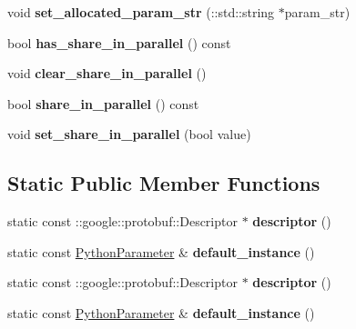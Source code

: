 \begin{DoxyCompactItemize}
void {\bfseries set\+\_\+allocated\+\_\+param\+\_\+str} (\+::std\+::string $\ast$param\+\_\+str)
\item 
\mbox{\label{classcaffe_1_1_python_parameter_abf6e28ac800ea4b9cb18fe6d4a0ff28e}} 
bool {\bfseries has\+\_\+share\+\_\+in\+\_\+parallel} () const
\item 
\mbox{\label{classcaffe_1_1_python_parameter_abb688fbfb89bc477941955511fb94291}} 
void {\bfseries clear\+\_\+share\+\_\+in\+\_\+parallel} ()
\item 
\mbox{\label{classcaffe_1_1_python_parameter_a57002d9da09ff4ec462e23a7dba97690}} 
bool {\bfseries share\+\_\+in\+\_\+parallel} () const
\item 
\mbox{\label{classcaffe_1_1_python_parameter_aa0c292ff47f8766e14180e54495e5033}} 
void {\bfseries set\+\_\+share\+\_\+in\+\_\+parallel} (bool value)
\end{DoxyCompactItemize}
\subsection*{Static Public Member Functions}
\begin{DoxyCompactItemize}
\item 
\mbox{\label{classcaffe_1_1_python_parameter_a7294f417dd3b8c0539aef2f90fae6749}} 
static const \+::google\+::protobuf\+::\+Descriptor $\ast$ {\bfseries descriptor} ()
\item 
\mbox{\label{classcaffe_1_1_python_parameter_aba97e31762347b5b0b7da9d49169118b}} 
static const \mbox{\hyperlink{classcaffe_1_1_python_parameter}{Python\+Parameter}} \& {\bfseries default\+\_\+instance} ()
\item 
\mbox{\label{classcaffe_1_1_python_parameter_abfc08cf50979c009d4da2a05efb926f0}} 
static const \+::google\+::protobuf\+::\+Descriptor $\ast$ {\bfseries descriptor} ()
\item 
\mbox{\label{classcaffe_1_1_python_parameter_adf4bacff6bc0f80ebefe01cf54f7336f}} 
static const \mbox{\hyperlink{classcaffe_1_1_python_parameter}{Python\+Parameter}} \& {\bfseries default\+\_\+instance} ()
\end{DoxyCompactItemize}
